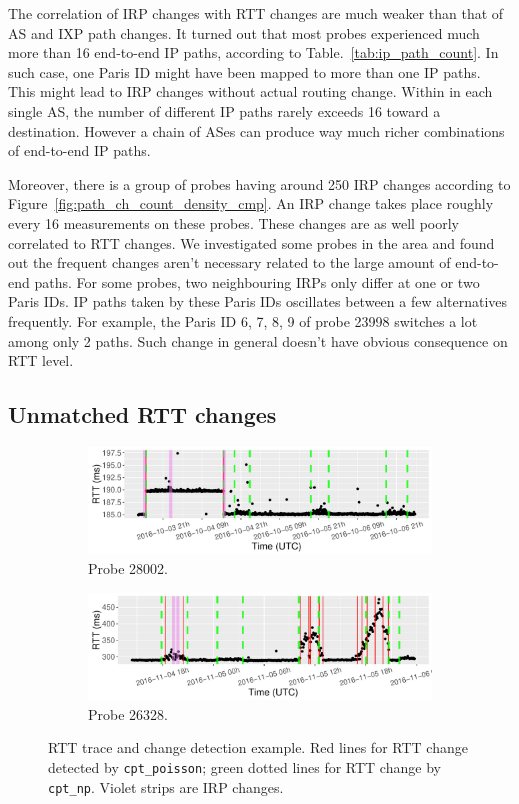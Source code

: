 The correlation of IRP changes with RTT changes are much weaker than that of AS and IXP path changes.
It turned out that most probes experienced much more than 16 end-to-end IP paths, according to Table.~\ref{tab:ip_path_count}.
In such case, one Paris ID might have been mapped to more than one IP paths.
This might lead to IRP changes without actual routing change.
Within in each single AS, the number of different IP paths rarely exceeds 16 toward a destination. 
However a chain of ASes can produce way much richer combinations of end-to-end IP paths.

Moreover, there is a group of probes having around 250 IRP changes according to Figure~\ref{fig:path_ch_count_density_cmp}.
An IRP change takes place roughly every 16 measurements on these probes. 
These changes are as well poorly correlated to RTT changes.
We investigated some probes in the area and found out the frequent changes aren't necessary related to the large amount of end-to-end paths.
For some probes, two neighbouring IRPs only differ at one or two Paris IDs.
IP paths taken by these Paris IDs oscillates between a few alternatives frequently.
For example, the Paris ID 6, 7, 8, 9 of probe 23998 switches a lot among only 2 paths.
Such change in general doesn't have obvious consequence on RTT level.

\subsection{Unmatched RTT changes}

\begin{figure}[!htb]
    \centering
    \begin{subfigure}[b]{.96\textwidth}
	\centering
	\includegraphics[width=\textwidth]{gfx/chap4/case_28002.pdf}
	\caption{\footnotesize Probe 28002.}
	\label{fig:case_28002}
	\end{subfigure}
	\begin{subfigure}[b]{.96\textwidth}
	\centering
	\includegraphics[width=\textwidth]{gfx/chap4/case_26328.pdf}
	\caption{\footnotesize Probe 26328.}
	\label{fig:case_26328}
	\end{subfigure}
\caption{RTT trace and change detection example. Red lines for RTT change detected by \texttt{cpt\_poisson}; green dotted lines for RTT change by \texttt{cpt\_np}. Violet strips are IRP changes.}
\label{fig:case_sensitivity}
\end{figure}

